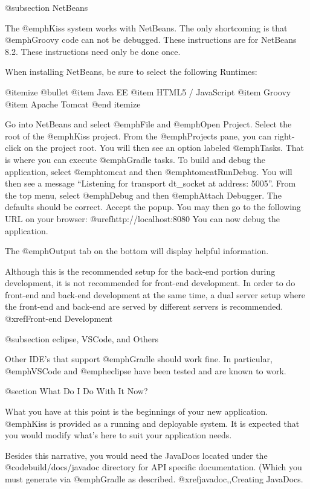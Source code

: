 @subsection NetBeans

The @emph{Kiss} system works with NetBeans.  The only shortcoming is
that @emph{Groovy} code can not be debugged.  These instructions are
for NetBeans 8.2.  These instructions need only be done once.

When installing NetBeans, be sure to select the following Runtimes:

@itemize @bullet
@item
Java EE
@item
HTML5 / JavaScript
@item
Groovy
@item
Apache Tomcat
@end itemize

Go into NetBeans and select @emph{File} and @emph{Open Project}.
Select the root of the @emph{Kiss} project.  From the @emph{Projects}
pane, you can right-click on the project root.  You will then see an
option labeled @emph{Tasks}.  That is where you can execute
@emph{Gradle} tasks.  To build and debug the application, select
@emph{tomcat} and then @emph{tomcatRunDebug}.  You will then see a
message ``Listening for transport dt_socket at address: 5005''.  From
the top menu, select @emph{Debug} and then @emph{Attach Debugger}.
The defaults should be correct.  Accept the popup.  You may then go to
the following URL on your browser: @uref{http://localhost:8080}
You can now debug the application.

The @emph{Output} tab on the bottom will display helpful information.


Although this is the recommended setup for the back-end portion during
development, it is not recommended for front-end development.  In
order to do front-end and back-end development at the same time, a
dual server setup where the front-end and back-end are served by
different servers is recommended.  @xref{Front-end Development}



@subsection eclipse, VSCode, and Others

Other IDE's that support @emph{Gradle} should work fine.  In
particular, @emph{VSCode} and @emph{eclipse} have been tested and are
known to work.

@section What Do I Do With It Now?

What you have at this point is the beginnings of your new application.
@emph{Kiss} is provided as a running and deployable system.  It is
expected that you would modify what's here to suit your application
needs.

Besides this narrative, you would need the JavaDocs located under the
@code{build/docs/javadoc} directory for API specific documentation.
(Which you must generate via @emph{Gradle} as described. @xref{javadoc,,Creating JavaDocs}.
